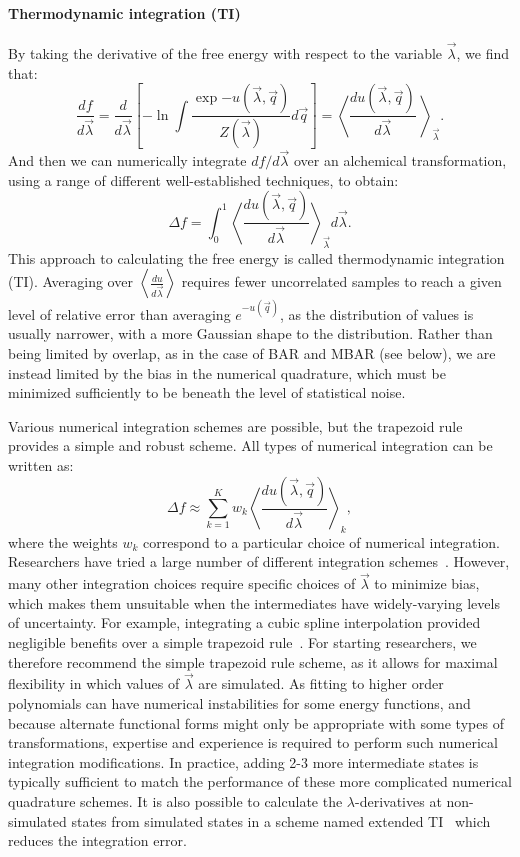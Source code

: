 \documentclass[9pt,bestpractices]{livecoms}
\newcommand{\expect}[1]{\left\langle{#1}\right\rangle}
\begin{document}
\paragraph{Thermodynamic integration (TI)}
By taking the derivative of the free energy with respect to the
variable $\vec{\lambda}$, we find that:
\begin{equation}
\frac{df}{d\vec{\lambda}} = \frac{d}{d\vec{\lambda}} \left[-\ln \int \frac{\exp{-u(\vec{\lambda},\vec{q})}}{Z(\vec{\lambda})} d\vec{q}\right] = \expect{\frac{du(\vec{\lambda},\vec{q})}{d\vec{\lambda}}\
}_{\vec{\lambda}} .
\end{equation}
And then we can numerically integrate $df/d\vec{\lambda}$ over an alchemical transformation, using a range of different well-established techniques, to obtain:
\begin{equation}
\Delta f    = \int_{0}^{1} \expect{\frac{du(\vec{\lambda},\vec{q})}{d\vec{\lambda}}}_{\vec{\lambda}}  d\vec{\lambda}.    
\end{equation}
This approach to calculating the free energy is called thermodynamic integration (TI). Averaging over $\expect{\frac{du}{d\vec{\lambda}}}$ requires fewer uncorrelated samples to reach a given level of relative error
than averaging $e^{-u(\vec{q})}$, as the distribution of values is usually narrower, with a more Gaussian shape to the distribution. Rather than being limited by overlap, as in the case of BAR and MBAR (see below), we are instead limited by the bias in the numerical quadrature, which must be minimized sufficiently to be beneath the level of statistical noise.

Various numerical integration schemes are possible, but the trapezoid
rule provides a simple and robust scheme. All types of numerical integration can be written as:
\[ \Delta f \approx \sum_{k=1}^{K} w_k
\expect{\frac{du(\vec{\lambda},\vec{q})}{d\vec{\lambda}}}_{k}, \] where the weights $w_k$ correspond to a particular choice of numerical integration.
Researchers have tried a large number of different integration schemes~\cite{resat1993studies,jorge2010effect,shyu2009reducing}. However, many other integration choices require specific choices of $\vec{\lambda}$ to minimize bias, which makes them unsuitable when the intermediates
have widely-varying levels of uncertainty. For example, integrating a cubic spline interpolation provided negligible benefits over a simple trapezoid rule~\cite{paliwal2011benchmark}. For starting researchers, we therefore recommend the simple trapezoid rule scheme, as it allows for maximal flexibility in which values of $\vec{\lambda}$ are simulated. As fitting to higher order polynomials can have numerical instabilities for some energy functions, and because alternate functional forms might only be appropriate with some types of transformations, expertise and experience is required to perform such numerical integration modifications. In practice, adding 2-3 more intermediate states is typically sufficient to match the performance of these more complicated numerical quadrature schemes. It is also possible to calculate the $\lambda$-derivatives at non-simulated states from simulated states in a scheme named extended TI~\cite{ruiter2016extended} which reduces the integration error.
\end{document}
